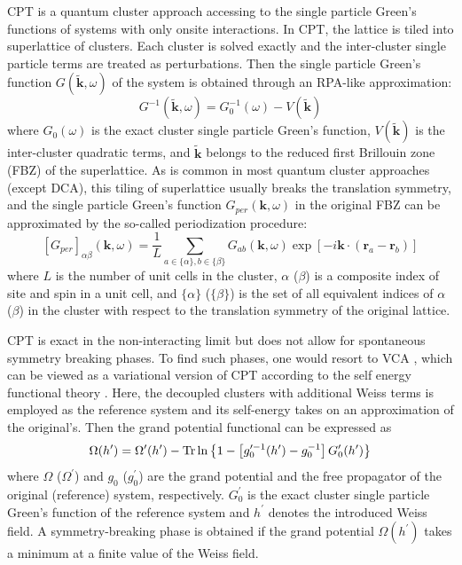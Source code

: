 \documentclass[12pt]{iopart}
\begin{document}
\par CPT \cite{SPP_PRL2000} is a quantum cluster approach accessing to the single particle Green's functions of systems with only onsite interactions. In CPT, the lattice is tiled into superlattice of clusters. Each cluster is solved exactly and the inter-cluster single particle terms are treated as perturbations. Then the single particle Green's function $G(\tilde{\mathbf{k}},\omega)$ of the system is obtained through an RPA-like approximation:
\begin{equation}\label{SPGF}
  G^{-1}(\tilde{\mathbf{k}},\omega)=G_0^{-1}(\omega)-V(\tilde{\mathbf{k}})
\end{equation}
where $G_0(\omega)$ is the exact cluster single particle Green's function, $V(\tilde{\mathbf{k}})$ is the inter-cluster quadratic terms, and $\tilde{\mathbf{k}}$ belongs to the reduced first Brillouin zone (FBZ) of the superlattice. As is common in most quantum cluster approaches (except DCA), this tiling of superlattice usually breaks the translation symmetry, and the single particle Green's function $G_{per}(\mathbf{k},\omega)$ in the original FBZ can be approximated by the so-called periodization procedure:
\begin{equation}\label{PP}
\left[G_{per}\right]_{\alpha\beta}(\mathbf{k},\omega)=
\frac{1}{L}\sum_{a\in\{\alpha\},b\in\{\beta\}}G_{ab}(\mathbf{k},\omega)\exp\left[-i \mathbf{k}\cdot(\mathbf{r}_a-\mathbf{r}_b)\right]
\end{equation}
where $L$ is the number of unit cells in the cluster, $\alpha$ ($\beta$) is a composite index of site and spin in a unit cell, and $\{\alpha\}$ ($\{\beta\}$) is the set of all equivalent indices of $\alpha$ ($\beta$) in the cluster with respect to the translation symmetry of the original lattice.

\par CPT is exact in the non-interacting limit but does not allow for spontaneous symmetry breaking phases. To find such phases, one would resort to VCA \cite{PAD_PRL2003}, which can be viewed as a variational version of CPT according to the self energy functional theory \cite{P_EPJB2003}. Here, the decoupled clusters with additional Weiss terms is employed as the reference system and its self-energy takes on an approximation of the original's. Then the grand potential functional can be expressed as
\begin{equation}\label{GP}
\Omega(h^\prime)=\Omega^\prime(h^\prime)-\mathop{\mathrm{Tr}}\nolimits\ln\left\{1-\left[g_0^{\prime-1}(h^\prime)-g_0^{-1}\right]G^\prime_0(h^\prime)\right\}
\end{equation}
where $\Omega$ ($\Omega^\prime$) and $g_0$ ($g_0^\prime$) are the grand potential and the free propagator of the original (reference) system, respectively. $G^\prime_0$ is the exact cluster single particle Green's function of the reference system and $h^\prime$ denotes the introduced Weiss field. A symmetry-breaking phase is obtained if the grand potential $\Omega(h^\prime)$ takes a minimum at a finite value of the Weiss field.
\end{document}
